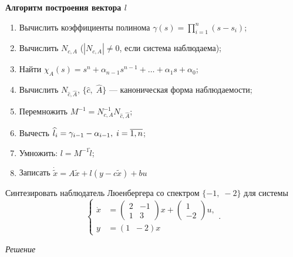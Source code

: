 \documentclass[../../TAU.tex]{subfiles}
\begin{document}
    \textbf{Алгоритм построения вектора $l$}

    \begin{enumerate}
        \item Вычислить коэффициенты полинома $\gamma(s) = \prod_{i=1}^{n}(s-s_i)$;
        \item Вычислить $N_{c,A}$ ($|N_{c,A}|\neq0$, если система наблюдаема);
        \item Найти $\chi_A(s) = s^n + \alpha_{n-1}s^{n-1} + \ldots + \alpha_1 s + \alpha_0$;
        \item Вычислить $N_{\widehat c, \widehat A}$, $\{\widehat c,\; \widehat A\}$ --- каноническая форма наблюдаемости;
        \item Перемножить $M^{-1} = N^{-1}_{c, A} N_{\widehat c, \widehat A}$;
        \item Вычесть $\widehat l_i = \gamma_{i-1} - \alpha_{i-1}, \; i=\overline{1,n}$;
        \item Умножить: $l =  M^{-1}\widehat l$;
        \item Записать $\dot{\tilde x} = A\tilde x + l(y - c\tilde x ) + b u$
    \end{enumerate}


    \examp
    {
        Синтезировать наблюдатель Люенбергера со спектром $\{-1,\; -2\}$ для системы
        $$
            \left\{
            \begin{aligned}
            \dot x &=
            \begin{pmatrix}
            2 & -1\\
            1 & 3
            \end{pmatrix}
             x + \begin{pmatrix}1\\ -2\end{pmatrix}u,\\
            y &= (1\;\; -2) x
            \end{aligned}
            \right..
        $$
    }

    \textit{Решение}
\end{document}

